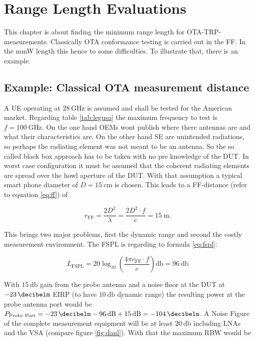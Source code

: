 \chapter{Range Length Evaluations}

This chapter is about finding the minimum range length for \ac{OTA}-\ac{TRP}-measurements. Classically \ac{OTA} conformance testing is carried out in the \ac{FF}. In the \ac{mmW} length this hence to some difficulties. To illustrate that, there is an example.

\section{Example: Classical OTA measurement distance}

A \ac{UE} operating at $\SI{28}{\giga\hertz}$ is assumed and shall be tested for the American market. Regarding table \ref{tab:legusa} the maximum frequency to test is $f = \SI{100}{\giga\hertz}$. On the one hand \acp{OEM} wont publish where there antennas are and what their characteristics are. On the other hand \ac{SE} are unintended radiations, so perhaps the radiating element was not meant to be an antenna. So the so called black box approach has to be taken with no pre knowledge of the \ac{DUT}. In worst case configuration it must be assumed that the coherent radiating elements are spread over the howl aperture of the \ac{DUT}. With that assumption a typical smart phone diameter of $D=\SI{15}{\centi\meter}$ is chosen. This leads to a \ac{FF}-distance (refer to equation \ref{eq:ff}) of 

\begin{equation}
r_{\text{FF}} = \frac{2D^2}{\lambda} = \frac{2D^2\cdot f}{c} = \SI{15}{\meter}.
\end{equation}

This brings two major problems, first the dynamic range and second the costly measurement environment. The \ac{FSPL} is regarding to formula \ref{eq:fspl}:

\begin{equation}
L_{\text{FSPL}} = 20\log_{10}\left(\frac{4\pi r_{\text{FF}} \cdot f}{c}\right)\si{\decibel} = \SI{96}{\decibel}
\end{equation}

With $\SI{15}{\decibel}$ gain from the probe antenna and a noise floor at the \ac{DUT} at $\SI{-23}{\decibelm}$ \ac{EIRP} (to have $\SI{10}{\decibel}$ dynamic range) the resulting power at the probe antenna port would be $P_{\text{Probe Port}} = \SI{-23}{\decibelm}-\SI{96}{\decibel}+\SI{15}{\decibel}=\SI{-104}{\decibelm}$. A Noise Figure of the complete measurement equipment will be at least $\SI{20}{\decibel}$ including \acp{LNA} and the \ac{VSA} (compare figure \ref{fig:danl}). With that the maximum \ac{RBW} would be 

